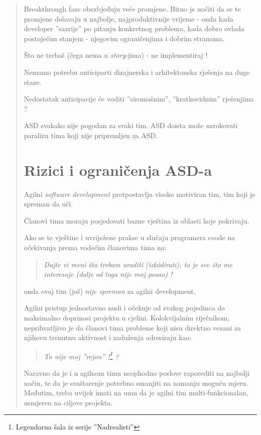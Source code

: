 \documentclass[lmodern, utf8, zavrsni]{fit}
\begin{document}
\begin{quote}
Breakthrough faze obezbjeđuju veće promjene. Bitno je uočiti da se te promjene dešavaju u najbolje, najproduktivnije vrijeme - onda kada developer ''sazrije'' po pitanju konkretnog problema, kada dobro ovlada postojećim stanjem - njegovim ograničenjima i dobrim stranama.

Što ne trebaš (čega nema u \emph{story}-jima) - ne implementiraj !

Nemamo potrebu anticiparti dizajnerska i arhitektonska rješenja na duge staze.

Nedostatak anticipacije će voditi ''siromašnim'', ''kratkovidnim'' rješenjima ?

ASD svakako nije pogodan za svaki tim. ASD doista može uzrokovati paralizu tima koji nije pripremljen za ASD.

\section{Rizici i ograničenja ASD-a}

Agilni \emph{software development} pretpostavlja visoko motiviran tim, tim koji je spreman da uči. 

Članovi tima moraju posjedovati bazne vještina iz oblasti koje pokrivaju.

Ako se te vještine i uvriježene prakse u slučaju programera svode na očekivanja prema vodećim članovima tima na:

\begin{quotation}
  \emph{Dajte vi meni šta trebam uraditi (izk\^odirati), to je sve što me interesuje (dalje od toga nije moj posao) !}
\end{quotation}

onda ovaj tim (još) \emph{nije spreman} za agilni development.

Agilni pristup jednostavno nudi i očekuje od svakog pojedinca da maksimalno doprinosi projektu u cjelini. Kolokvijalnim riječnikom, neprihvatljivo je da članovi tima probleme koji nisu direktno vezani za njihovu trenutnu aktivnost i zaduženja adresiraju kao:

\begin{quotation}
  \emph{To nije moj ''rejon'' !\footnote{Legendarna šala iz serije ''Nadrealisti''} ?}
\end{quotation}

Naravno da je i u agilnom timu neophodno poslove raporediti na najbolji način, te da je svaštarenje potrebno smanjiti na namanju moguću mjeru.
Međutim, treba uvijek imati na umu da je agilni tim multi-funkcionalan, usmjeren na ciljeve projekta.


\end{quote}
\end{document}
